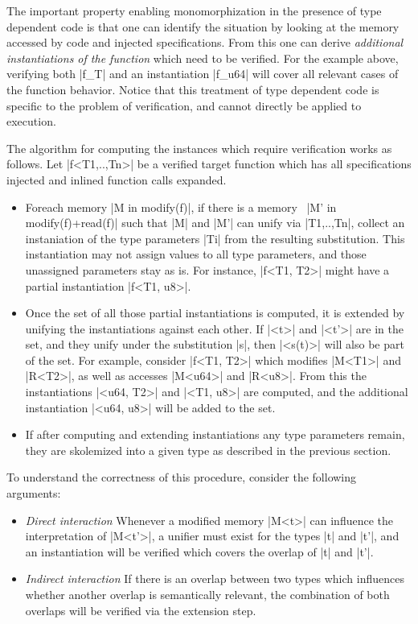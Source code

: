 The important property enabling monomorphization in the presence of type
dependent code is that one can identify the situation by looking at the memory
accessed by code and injected specifications. From this one can derive
\emph{additional instantiations of the function} which need to be verified. For
the example above, verifying both |f_T| and an instantiation |f_u64| will cover
all relevant cases of the function behavior. Notice that this treatment of type
dependent code is specific to the problem of verification, and cannot directly
be applied to execution.

The algorithm for computing the instances which require verification works as
follows. Let |f<T1,..,Tn>| be a verified target function which has all
specifications injected and inlined function calls expanded.
\begin{itemize}
\item Foreach memory |M in modify(f)|, if there is a memory~%
  |M' in modify(f)+read(f)| such that |M| and |M'| can unify via |T1,..,Tn|,
  collect an instaniation of the type parameters |Ti| from the resulting
  substitution. This instantiation may not assign values to all type parameters,
  and those unassigned parameters stay as is. For instance, |f<T1, T2>| might
  have a partial instantiation |f<T1, u8>|.
\item Once the set of all those partial instantiations is computed, it is
  extended by unifying the instantiations against each other. If |<t>| and
  |<t'>| are in the set, and they unify under the substitution |s|, then
  |<s(t)>| will also be part of the set.  For example, consider |f<T1, T2>|
  which modifies |M<T1>| and |R<T2>|, as well as accesses |M<u64>| and
  |R<u8>|. From this the instantiations |<u64, T2>| and |<T1, u8>| are computed,
  and the additional instantiation |<u64, u8>| will be added to the set.
\item If after computing and extending instantiations any type parameters
  remain, they are skolemized into a given type as described in the previous
  section.
\end{itemize}

To understand the correctness of this procedure, consider the following arguments:

\begin{itemize}
\item \emph{Direct interaction} Whenever a modified memory |M<t>| can influence
  the interpretation of |M<t'>|, a unifier must exist for the types |t| and |t'|,
  and an instantiation will be verified which covers the overlap of |t| and
  |t'|.
\item \emph{Indirect interaction} If there is an overlap between two types
  which influences whether another overlap is semantically relevant, the
  combination of both overlaps will be verified via the extension step.
\end{itemize}



